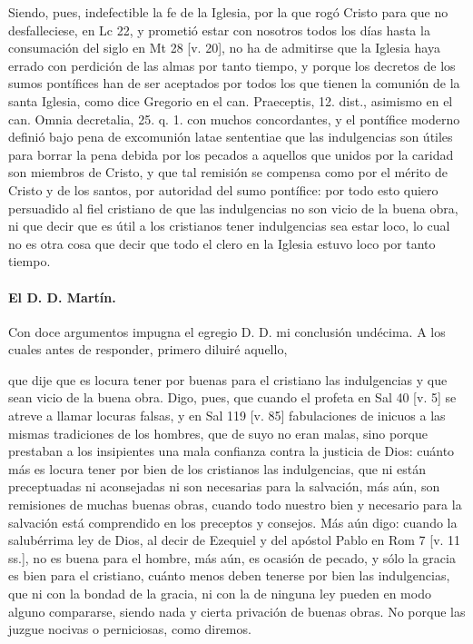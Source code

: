 Siendo, pues, indefectible la fe de la Iglesia, por la que rogó Cristo para que no desfalleciese, en Lc 22, y prometió estar con nosotros todos los días hasta la consumación del siglo en Mt 28 [v. 20], no ha de admitirse que la Iglesia haya errado con perdición de las almas por tanto tiempo, y porque los decretos de los sumos pontífices han de ser aceptados por todos los que tienen la comunión de la santa Iglesia, como dice Gregorio en el can. Praeceptis, 12. dist., asimismo en el can. Omnia decretalia, 25. q. 1. con muchos concordantes, y el pontífice moderno definió bajo pena de excomunión latae sententiae que las indulgencias son útiles para borrar la pena debida por los pecados a aquellos que unidos por la caridad son miembros de Cristo, y que tal remisión se compensa como por el mérito de Cristo y de los santos, por autoridad del sumo pontífice: por todo esto quiero persuadido al fiel cristiano de que las indulgencias no son vicio de la buena obra, ni que decir que es útil a los cristianos tener indulgencias sea estar loco, lo cual no es otra cosa que decir que todo el clero en la Iglesia estuvo loco por tanto tiempo.

\paragraph*{El D. D. Martín.}

Con doce argumentos impugna el egregio D. D. mi conclusión undécima. A los cuales antes de responder, primero diluiré aquello,

que dije que es locura tener por buenas para el cristiano las indulgencias y que sean vicio de la buena obra. Digo, pues, que cuando el profeta en Sal 40 [v. 5] se atreve a llamar locuras falsas, y en Sal 119 [v. 85] fabulaciones de inicuos a las mismas tradiciones de los hombres, que de suyo no eran malas, sino porque prestaban a los insipientes una mala confianza contra la justicia de Dios: cuánto más es locura tener por bien de los cristianos las indulgencias, que ni están preceptuadas ni aconsejadas ni son necesarias para la salvación, más aún, son remisiones de muchas buenas obras, cuando todo nuestro bien y necesario para la salvación está comprendido en los preceptos y consejos. Más aún digo: cuando la salubérrima ley de Dios, al decir de Ezequiel y del apóstol Pablo en Rom 7 [v. 11 ss.], no es buena para el hombre, más aún, es ocasión de pecado, y sólo la gracia es bien para el cristiano, cuánto menos deben tenerse por bien las indulgencias, que ni con la bondad de la gracia, ni con la de ninguna ley pueden en modo alguno compararse, \marginpar{\small[347]} siendo nada y cierta privación de buenas obras. No porque las juzgue nocivas o perniciosas, como diremos.

